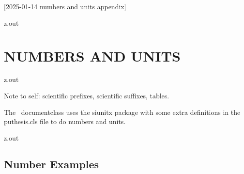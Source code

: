 [2025-01-14 numbers and units appendix]

%




\begin{VerbatimOut}{z.out}
\chapter{NUMBERS AND UNITS}
\end{VerbatimOut}

\MyIO


\begin{VerbatimOut}{z.out}

Note to self: scientific prefixes, scientific suffixes, tables.

The \PurdueThesisLogo\ documentclass
uses the siunitx \cite{wright2024} package
with some extra definitions in the puthesis.cls file
to do numbers and units.
\end{VerbatimOut}

\MyIO


\begin{VerbatimOut}{z.out}

\section{Number Examples}
\end{VerbatimOut}

\MyIO


